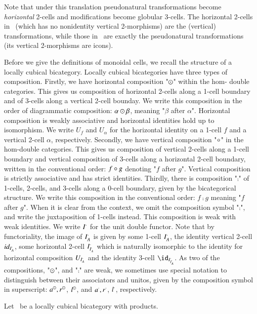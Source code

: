 Note that under this translation pseudonatural transformations become \emph{horizontal} 2-cells and modifications become globular 3-cells.
The horizontal 2-cells in \cDblf\ (which has no nonidentity vertical 2-morphisms) are the (vertical) transformations, while those in \fBicat\ are exactly the pseudonatural transformations (its vertical 2-morphisms are icons).

Before we give the definitions of monoidal cells, we recall the structure of a locally cubical bicategory. Locally cubical bicategories have three types of composition. Firstly, we have horizontal composition "$\odot$" within the hom- double categories. This gives us composition of horizontal 2-cells along a 1-cell boundary and of 3-cells along a vertical 2-cell bounday. We write this composition in the order of diagrammatic composition: $\alpha \odot \beta$, meaning "$\beta$ after $\alpha$". Horizontal composition is weakly associative and horizontal identities hold up to isomorphism. We write $U_{f}$ and $U_{\alpha}$ for the horizontal identity on a 1-cell $f$ and a vertical 2-cell $\alpha$, respectively. 
Secondly, we have vertical composition "$\circ$" in the hom-double categories. This gives us composition of vertical 2-cells along a 1-cell boundary and vertical composition of 3-cells along a horizontal 2-cell boundary, written in the conventional order: $f \circ g$ denoting "$f$ after $g$". Vertical composition is strictly associative and has strict identities.
Thirdly, there is composition "$\comp$" of 1-cells, 2-cells, and 3-cells along a 0-cell boundary, given by the bicategorical structure. We write this composition in the conventional order: $f \comp g$ meaning "$f$ after $g$". When it is clear from the context, we omit the composition symbol "$\comp$",  and write the juxtaposition of 1-cells instead. This composition is weak with weak identities. We write $I^{\cdot}$ for the unit double functor. Note that by functoriality, the image of $I^{\cdot}_A$ is given by some 1-cell $I^{\cdot}_A$, the identity vertical 2-cell $id_{I^{\cdot}_A}$, some horizontal 2-cell $I^{\cdot}_{I^{\cdot}_A}$ which is naturally isomorphic to the identity for horizontal composition $U_{I^{\cdot}_A}$ and the identity 3-cell  $\id_{\compI_{\compI_A}}$.
As two of the compositions, "$\odot$", and "$\comp$" are weak, we sometimes use special notation to distinguish between their associators and unitos, given by the composition symbol in superscript: $a^{\odot}, r^{\odot}$, $l^{\odot}$, and $a^{\cdot}, r^{\cdot}$, $l^{\cdot}$, respectively.

Let \fB\ be a locally cubical bicategory with products.

